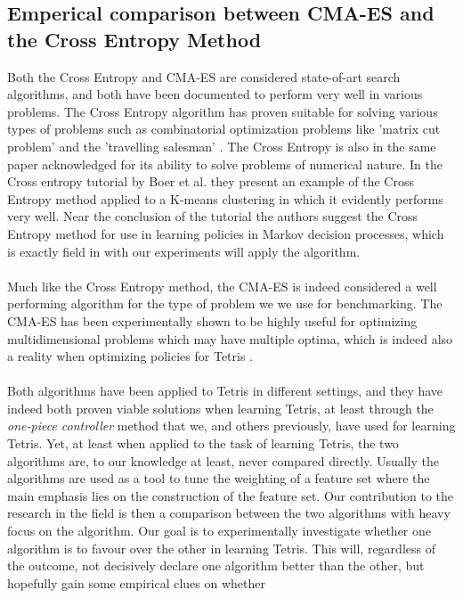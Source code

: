 \subsection{Emperical comparison between CMA-ES and the Cross Entropy Method}

Both the Cross Entropy and CMA-ES are considered state-of-art
search algorithms, and both have been documented to perform very well
in various problems. The Cross Entropy algorithm has proven 
suitable for solving various types of problems such as 
combinatorial optimization problems like 'matrix cut problem'
and the 'travelling salesman' \citep{cetut2014}. 
The Cross Entropy is also in the same paper acknowledged for
its ability to solve problems of numerical nature. In the 
Cross entropy tutorial by Boer et al. they present 
an example of the Cross Entropy method applied to 
a K-means clustering in which it evidently performs very well.
Near the conclusion of the tutorial the authors suggest the 
Cross Entropy method for use in learning policies in Markov decision 
processes, which is exactly field in with our experiments will apply the
algorithm.\\
\\
Much like the Cross Entropy method, the CMA-ES is indeed considered
a well performing algorithm for the type of problem we we use for benchmarking.
The CMA-ES has been experimentally shown to be highly useful for optimizing multidimensional
problems which may have multiple optima, which is indeed also a reality when 
optimizing policies for Tetris \citep{hansen2004}.\\
\\
Both algorithms have been applied to Tetris in different settings, and they have
indeed both proven viable solutions when learning Tetris, at least through the
\textit{one-piece controller} method that we, and others previously, have used
for learning Tetris. Yet, at least when applied to the task of learning Tetris,
the two algorithms are, to our knowledge at least, never compared directly. Usually
the algorithms are used as a tool to tune the weighting of a feature set where the
main emphasis lies on the construction of the feature set. Our contribution to 
the research in the field is then a comparison between the two algorithms
with heavy focus on the algorithm. Our goal is to experimentally investigate
whether one algorithm is to favour over the other in learning Tetris.
This will, regardless of the outcome, not decisively declare one algorithm 
better than the other, but hopefully gain some empirical clues on whether 
